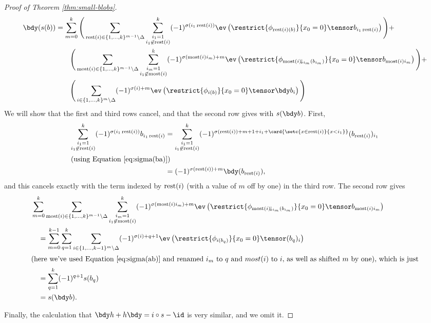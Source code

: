\begin{proof}[Proof of Theorem \ref{thm:small-blobs}]
\begin{align*}
\bdy(s(b)) & = \sum_{m=0}^{k} \Bigg( \sum_{\rest(i) \in \{1, \ldots, k\}^{m-1} \setminus \Delta} \sum_{\substack{i_1 = 1 \\ i_1 \not\in \rest(i)}}^{k}  (-1)^{\sigma(i_1\rest(i))} \ev\left(\restrict{\phi_{\rest(i)(b)}}{x_0 = 0}\tensor b_{i_1\rest(i)}\right) \Bigg)+ \\
	& \qquad \Bigg( \sum_{\most(i) \in \{1, \ldots, k\}^{m-1} \setminus \Delta} \sum_{\substack{i_m = 1 \\ i_1 \not\in \most(i)}}^{k}  (-1)^{\sigma(\most(i) i_m) + m} \ev\left(\restrict{\phi_{\most(i)\!\downarrow_{i_m}(b_{i_m})}}{x_0 = 0}\tensor b_{\most(i) i_m}\right)\Bigg) + \\
	& \qquad \Bigg( \sum_{i \in \{1, \ldots, k\}^{m} \setminus \Delta} (-1)^{\sigma(i) + m} \ev\left(\restrict{\phi_{i(b)}}{x_0 = 0} \tensor \bdy b_i\right)\Bigg)
\end{align*}
We will show that the first and third rows cancel, and that the second row gives with $s(\bdy b)$.
First,
\begin{align*}
\sum_{\substack{i_1 = 1 \\ i_1 \not\in \rest(i)}}^{k} (-1)^{\sigma(i_1\rest(i))} b_{i_1\rest(i)} & =
	\sum_{\substack{i_1 = 1 \\ i_1 \not\in \rest(i)}}^{k} (-1)^{\sigma(\rest(i))+m+1+i_1 + \card{\setc{x \in \rest(i)}{x<i_1}}}  (b_{\rest(i)})_{i_1} \\
\intertext{(using Equation \eqref{eq:sigma(ba)})}
& = (-1)^{\sigma(\rest(i))+m} \bdy (b_{\rest(i)}),
\end{align*}
and this cancels exactly with the term indexed by $\operatorname{rest}(i)$ (with a value of $m$ off by one) in the third row.
The second row gives 
\begin{align*}
& \sum_{m=0}^k  \sum_{\most(i) \in \{1, \ldots, k\}^{m-1} \setminus \Delta} \sum_{\substack{i_m = 1 \\ i_1 \not\in \most(i)}}^{k}  (-1)^{\sigma(\most(i) i_m) + m} \ev\left(\restrict{\phi_{\most(i)\!\downarrow_{i_m}(b_{i_m})}}{x_0 = 0}\tensor b_{\most(i) i_m}\right) \\
& \quad = \sum_{m=0}^{k-1} \sum_{q=1}^k \sum_{i \in \{1, \ldots, k-1\}^m\setminus \Delta} (-1)^{\sigma(i)+q+1} \ev\left(\restrict{\phi_{i(b_{q})}}{x_0 = 0}\tensor (b_q)_i\right) \\
\intertext{(here we've used Equation \eqref{eq:sigma(ab)} and renamed $i_m$ to $q$ and $most(i)$ to $i$, as well as shifted $m$ by one), which is just}
& \quad = \sum_{q=1}^k (-1)^{q+1} s(b_q) \\
& \quad = s(\bdy b).
\end{align*}

Finally, the calculation that $\bdy h+h \bdy=i\circ s - \id$ is very similar, and we omit it.
\end{proof}
 